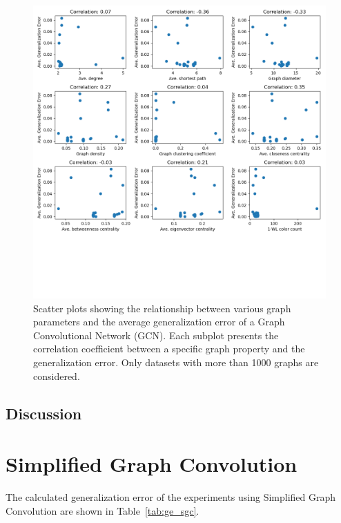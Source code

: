 \begin{figure}[H]
    \centering
    \includegraphics[scale=0.6]{images/correlation_ignore_less_than_1000_GCN.png}
    \caption{Scatter plots showing the relationship between various graph parameters and the average generalization error of a Graph Convolutional Network (GCN). Each subplot presents the correlation coefficient between a specific graph property and the generalization error. Only datasets with more than 1000 graphs are considered.}
    \label{fig:correlation_ignore_less_than_1000_GCN}
\end{figure}

\subsection{Discussion} 




\section{Simplified Graph Convolution}
The calculated generalization error of the experiments using Simplified Graph Convolution are shown in Table~\ref{tab:ge_sgc}.


